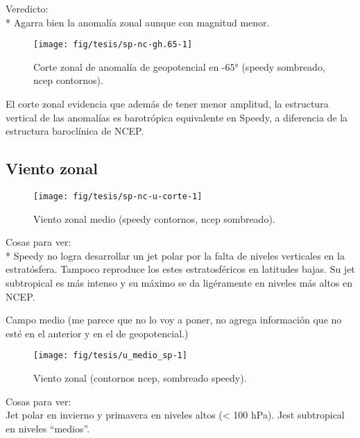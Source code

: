 \documentclass[spanish,a4paper]{book}
\begin{document}
Veredicto:\\
* Agarra bien la anomalía zonal aunque con magnitud menor.

\begin{figure}

{\centering \texttt{[image: fig/tesis/sp-nc-gh.65-1]} 

}

\caption{Corte zonal de anomalía de geopotencial en -65° (speedy sombreado, ncep contornos).}\label{fig:sp-nc-gh.65}
\end{figure}

El corte zonal evidencia que además de tener menor amplitud, la
estructura vertical de las anomalías es barotrópica equivalente en
Speedy, a diferencia de la estructura baroclínica de NCEP.

\subsection{Viento zonal}\label{viento-zonal-1}

\begin{figure}

{\centering \texttt{[image: fig/tesis/sp-nc-u-corte-1]} 

}

\caption{Viento zonal medio (speedy contornos, ncep sombreado).}\label{fig:sp-nc-u-corte}
\end{figure}

Cosas para ver:\\
* Speedy no logra desarrollar un jet polar por la falta de niveles
verticales en la estratósfera. Tampoco reproduce los estes
estratosféricos en latitudes bajas. Su jet subtropical es más intenso y
su máximo se da ligéramente en niveles más altos en NCEP.

Campo medio (me parece que no lo voy a poner, no agrega información que
no esté en el anterior y en el de geopotencial.)

\begin{figure}

{\centering \texttt{[image: fig/tesis/u\_medio\_sp-1]} 

}

\caption{Viento zonal (contornos ncep, sombreado speedy).}\label{fig:u_medio_sp}
\end{figure}

Cosas para ver:\\
Jet polar en invierno y primavera en niveles altos (\textless{} 100
hPa). Jest subtropical en niveles ``medios''.
\end{document}

